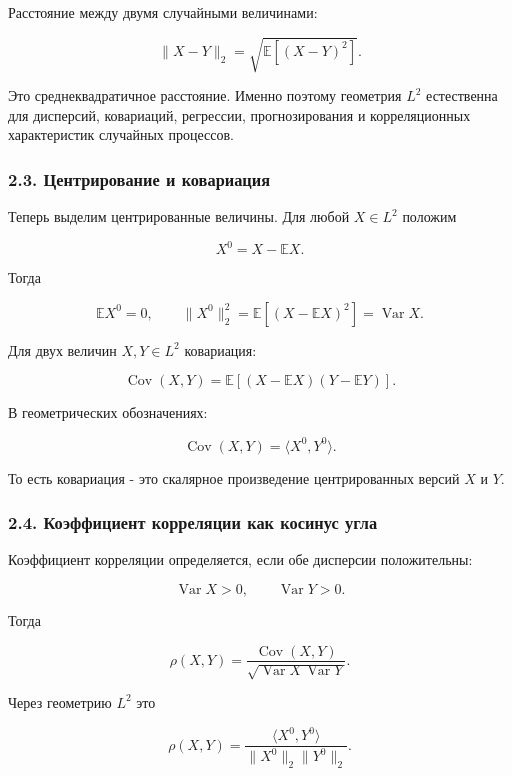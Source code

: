\documentclass[
  11pt,
  a4paper,
]{article}
\begin{document}
Расстояние между двумя случайными величинами:

\[
\|X-Y\|_2
=
\sqrt{\mathbb E[(X-Y)^2]}.
\]

Это среднеквадратичное расстояние. Именно поэтому геометрия \(L^2\)
естественна для дисперсий, ковариаций, регрессии, прогнозирования и
корреляционных характеристик случайных процессов.

\subsubsection{2.3. Центрирование и
ковариация}\label{ux446ux435ux43dux442ux440ux438ux440ux43eux432ux430ux43dux438ux435-ux438-ux43aux43eux432ux430ux440ux438ux430ux446ux438ux44f}

Теперь выделим центрированные величины. Для любой \(X\in L^2\) положим

\[
X^0=X-\mathbb EX.
\]

Тогда

\[
\mathbb EX^0=0,
\qquad
\|X^0\|_2^2
=
\mathbb E[(X-\mathbb EX)^2]
=
\operatorname{Var}X.
\]

Для двух величин \(X,Y\in L^2\) ковариация:

\[
\operatorname{Cov}(X,Y)
=
\mathbb E[(X-\mathbb EX)(Y-\mathbb EY)].
\]

В геометрических обозначениях:

\[
\operatorname{Cov}(X,Y)=\langle X^0,Y^0\rangle.
\]

То есть ковариация - это скалярное произведение центрированных версий
\(X\) и \(Y\).

\subsubsection{2.4. Коэффициент корреляции как косинус
угла}\label{ux43aux43eux44dux444ux444ux438ux446ux438ux435ux43dux442-ux43aux43eux440ux440ux435ux43bux44fux446ux438ux438-ux43aux430ux43a-ux43aux43eux441ux438ux43dux443ux441-ux443ux433ux43bux430}

Коэффициент корреляции определяется, если обе дисперсии положительны:

\[
\operatorname{Var}X>0,
\qquad
\operatorname{Var}Y>0.
\]

Тогда

\[
\rho(X,Y)
=
\frac{\operatorname{Cov}(X,Y)}
{\sqrt{\operatorname{Var}X\,\operatorname{Var}Y}}.
\]

Через геометрию \(L^2\) это

\[
\rho(X,Y)
=
\frac{\langle X^0,Y^0\rangle}{\|X^0\|_2\|Y^0\|_2}.
\]
\end{document}
